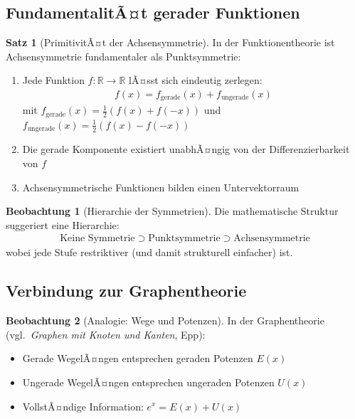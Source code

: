 ﻿\documentclass[a4paper,12pt]{article}
\theoremstyle{definition}
\newtheorem{satz}{Satz}
\newtheorem{beobachtung}{Beobachtung}
\begin{document}
\subsection{FundamentalitÃ¤t gerader Funktionen}

\begin{satz}[PrimitivitÃ¤t der Achsensymmetrie]
In der Funktionentheorie ist Achsensymmetrie fundamentaler als Punktsymmetrie:
\begin{enumerate}
  \item Jede Funktion $f: \mathbb{R} \to \mathbb{R}$ lÃ¤sst sich eindeutig
        zerlegen:
        \begin{align}
          f(x) = f_{\text{gerade}}(x) + f_{\text{ungerade}}(x)
        \end{align}
        mit $f_{\text{gerade}}(x) = \tfrac{1}{2}(f(x)+f(-x))$ und
        $f_{\text{ungerade}}(x) = \tfrac{1}{2}(f(x)-f(-x))$
  \item Die gerade Komponente existiert unabhÃ¤ngig von der
        Differenzierbarkeit von $f$
  \item Achsensymmetrische Funktionen bilden einen Untervektorraum
\end{enumerate}
\end{satz}

\begin{beobachtung}[Hierarchie der Symmetrien]
Die mathematische Struktur suggeriert eine Hierarchie:
\begin{align}
  \text{Keine Symmetrie} \supset \text{Punktsymmetrie}
  \supset \text{Achsensymmetrie}
\end{align}
wobei jede Stufe restriktiver (und damit strukturell einfacher) ist.
\end{beobachtung}

\subsection{Verbindung zur Graphentheorie}

\begin{beobachtung}[Analogie: Wege und Potenzen]
In der Graphentheorie (vgl.\ \emph{Graphen mit Knoten und Kanten}, Epp):
\begin{itemize}
  \item[-] Gerade WegelÃ¤ngen entsprechen geraden Potenzen $E(x)$
  \item[-] Ungerade WegelÃ¤ngen entsprechen ungeraden Potenzen $U(x)$
  \item[-] VollstÃ¤ndige Information: $e^x = E(x) + U(x)$
\end{itemize}
\end{beobachtung}
\end{document}
